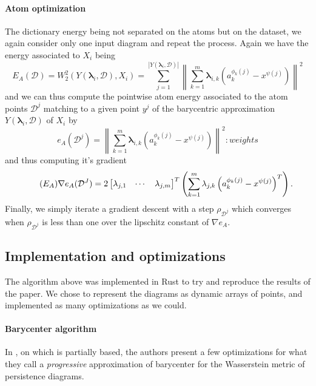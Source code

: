 \documentclass[sigconf,nonacm]{acmart}
\def\abs#1{\left|#1\right|}
\def\norm#1{\left\lVert#1\right\rVert}
\def\llambda{\mathbf{\lambda}}
\def\D{\mathcal{D}}
\begin{document}
\paragraph{Atom optimization}
The dictionary energy being not separated on the atoms but on the dataset, we again consider only one input
diagram and repeat the process.
Again we have the energy associated to $X_{i}$ being
\begin{equation*}
	E_{A}(\D) = W_{2}^{2}(Y(\llambda_{i}, \D), X_{i}) = \sum_{j = 1}^{\abs{Y(\llambda_{i}, \D)}}\norm{\sum_{k = 1}^{m}
		\llambda_{i, k}\left(a_{k}^{\phi_{k}(j)} - x^{\psi(j)}\right)}^{2}
\end{equation*}
and we can thus compute the pointwise atom energy associated to the atom points $\D^{j}$
matching to a given point $y^{j}$ of the barycentric approximation $Y(\llambda_{i}, \D)$ of $X_{i}$ by
\begin{equation*}
	e_{A}(\D^{j}) = \norm{\sum_{k = 1}^{m}\llambda_{i, k}(a_{k}^{\phi_{k}(j)} - x^{\psi(j)})}^{2}:weights
\end{equation*}
and thus computing it's gradient
\begin{equation}\label{eq:ea-grad}\tag{$E_{A}$}
	\nabla e_{A}(\D^{J}) = 2
	\begin{bmatrix}
		\llambda_{j, 1} & \cdots & \llambda_{j, m}
	\end{bmatrix}^{T}
	\left(\sum_{k = 1}^{m}\llambda_{j, k}\left(a_{k}^{\phi_{k}(j)} - x^{\psi(j)}\right)^{T}\right).
\end{equation}
Finally, we simply iterate a gradient descent with a step $\rho_{\D^{j}}$ which converges when $\rho_{\D^{j}}$ is less than one over the lipschitz constant of $\nabla e_{A}$.

\subsection{Implementation and optimizations}
The algorithm above was implemented in Rust to try and reproduce the results of the paper.
We chose to represent the diagrams as dynamic arrays of points, and implemented as many optimizations as
we could.

\paragraph{Barycenter algorithm}
In \cite{Vidal_2019}, on which \cite{sisouk2023wassersteindictionariespersistencediagrams} is partially
based, the authors present a few optimizations for what they call a \emph{progressive} approximation of
barycenter for the Wasserstein metric of persistence diagrams.
\end{document}
